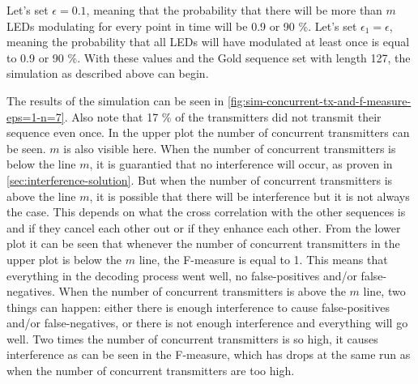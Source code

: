 Let's set $\epsilon = 0.1$, meaning that the probability that there will be more than $m$ LEDs modulating for every point in time will be 0.9 or 90 \%.
Let's set $\epsilon_1 = \epsilon$, meaning the probability that all LEDs will have modulated at least once is equal to 0.9 or 90 \%.
With these values and the Gold sequence set with length 127, the simulation as described above can begin. 

The results of the simulation can be seen in \autoref{fig:sim-concurrent-tx-and-f-measure-eps=1-n=7}.
Also note that 17 \% of the transmitters did not transmit their sequence even once.
In the upper plot the number of concurrent transmitters can be seen. 
$m$ is also visible here.
When the number of concurrent transmitters is below the line $m$, it is guarantied that no interference will occur, as proven in \autoref{sec:interference-solution}.
But when the number of concurrent transmitters is above the line $m$, it is possible that there will be interference but it is not always the case.
This depends on what the cross correlation with the other sequences is and if they cancel each other out or if they enhance each other.
From the lower plot it can be seen that whenever the number of concurrent transmitters in the upper plot is below the $m$ line, the F-measure is equal to 1.
This means that everything in the decoding process went well, no false-positives and/or false-negatives.
When the number of concurrent transmitters is above the $m$ line, two things can happen: either there is enough interference to cause false-positives and/or false-negatives, or there is not enough interference and everything will go well.
Two times the number of concurrent transmitters is so high, it causes interference as can be seen in the F-measure, which has drops at the same run as when the number of concurrent transmitters are too high.

